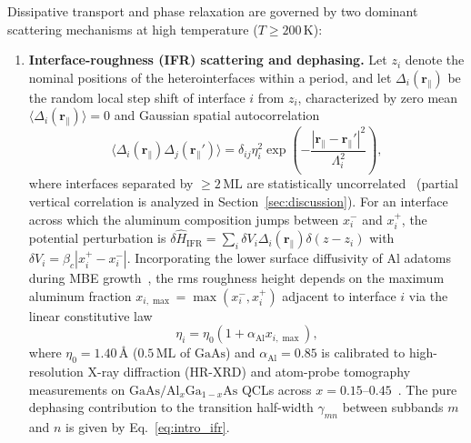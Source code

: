 \documentclass[11pt,letterpaper]{article}
\begin{document}
Dissipative transport and phase relaxation are governed by two dominant scattering mechanisms at high temperature ($T \ge 200\,\mathrm{K}$):
\begin{enumerate}
    \item \textbf{Interface-roughness (IFR) scattering and dephasing.} Let $z_i$ denote the nominal positions of the heterointerfaces within a period, and let $\Delta_i(\bm{r}_\parallel)$ be the random local step shift of interface $i$ from $z_i$, characterized by zero mean $\langle \Delta_i(\bm{r}_\parallel)\rangle = 0$ and Gaussian spatial autocorrelation
    \begin{equation}
    \langle \Delta_i(\bm{r}_\parallel)\Delta_j(\bm{r}_\parallel')\rangle = \delta_{ij}\eta_i^2 \exp\left(-\frac{|\bm{r}_\parallel - \bm{r}_\parallel'|^2}{\Lambda_i^2}\right),
    \label{eq:ifr_corr}
    \end{equation}
    where interfaces separated by $\ge 2\,\mathrm{ML}$ are statistically uncorrelated~\cite{Unuma2003,Chiu2012} (partial vertical correlation is analyzed in Section~\ref{sec:discussion}). For an interface across which the aluminum composition jumps between $x_i^-$ and $x_i^+$, the potential perturbation is $\delta\hat{H}_{\mathrm{IFR}} = \sum_i \delta V_i \Delta_i(\bm{r}_\parallel)\delta(z - z_i)$ with $\delta V_i = \beta_c |x_i^+ - x_i^-|$. Incorporating the lower surface diffusivity of $\mathrm{Al}$ adatoms during MBE growth~\cite{Shitara1993,LiLinfieldRoadmap2025}, the rms roughness height depends on the maximum aluminum fraction $x_{i,\max} = \max(x_i^-, x_i^+)$ adjacent to interface $i$ via the linear constitutive law
    \begin{equation}
    \eta_i = \eta_0 \left(1 + \alpha_{\mathrm{Al}} x_{i,\max}\right),
    \label{eq:eta_constitutive}
    \end{equation}
    where $\eta_0 = 1.40$\,\AA{} ($0.5\,\mathrm{ML}$ of $\mathrm{GaAs}$) and $\alpha_{\mathrm{Al}} = 0.85$ is calibrated to high-resolution X-ray diffraction (HR-XRD) and atom-probe tomography measurements on $\mathrm{GaAs}/\mathrm{Al}_x\mathrm{Ga}_{1-x}\mathrm{As}$ QCLs across $x = 0.15\text{--}0.45$~\cite{LiLinfieldRoadmap2025,Khalatpour2023}. The pure dephasing contribution to the transition half-width $\gamma_{mn}$ between subbands $m$ and $n$ is given by Eq.~\eqref{eq:intro_ifr}.


\end{enumerate}
\end{document}
